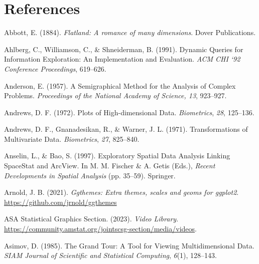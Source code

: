 \documentclass[
  letterpaper,
]{krantz}
\newlength{\cslhangindent}
\newlength{\cslentryspacingunit} %
\newenvironment{CSLReferences}[2] %
 {%
  \setlength{\parindent}{0pt}
  \ifodd #1
  \let\oldpar\par
  \def\par{\hangindent=\cslhangindent\oldpar}
  \fi
  \setlength{\parskip}{#2\cslentryspacingunit}
 }%
 {}
\begin{document}

\hypertarget{references}{%
\chapter*{References}\label{references}}


\hypertarget{refs}{}
\begin{CSLReferences}{1}{0}
\leavevmode{}%
Abbott, E. (1884). \emph{Flatland: A romance of many dimensions}. Dover
Publications.

\leavevmode{}%
Ahlberg, C., Williamson, C., \& Shneiderman, B. (1991). Dynamic
{Q}ueries for {I}nformation {E}xploration: {A}n {I}mplementation and
{E}valuation. \emph{ACM CHI `92 Conference Proceedings}, 619--626.

\leavevmode{}%
Anderson, E. (1957). A {S}emigraphical {M}ethod for the {A}nalysis of
{C}omplex {P}roblems. \emph{Proceedings of the National Academy of
Science, 13}, 923--927.

\leavevmode{}%
Andrews, D. F. (1972). {P}lots of {H}igh-dimensional {D}ata.
\emph{Biometrics}, \emph{28}, 125--136.

\leavevmode{}%
Andrews, D. F., Gnanadesikan, R., \& Warner, J. L. (1971).
{T}ransformations of {M}ultivariate {D}ata. \emph{Biometrics},
\emph{27}, 825--840.

\leavevmode{}%
Anselin, L., \& Bao, S. (1997). {E}xploratory {S}patial {D}ata
{A}nalysis {L}inking {S}pace{S}tat and {A}rc{V}iew. In M. M. Fischer \&
A. Getis (Eds.), \emph{{R}ecent {D}evelopments in {S}patial {A}nalysis}
(pp. 35--59). Springer.

\leavevmode{}%
Arnold, J. B. (2021). \emph{Ggthemes: Extra themes, scales and geoms for
ggplot2}. \url{https://github.com/jrnold/ggthemes}

\leavevmode{}%
ASA Statistical Graphics Section. (2023). \emph{Video {L}ibrary}.
\url{https://community.amstat.org/jointscsg-section/media/videos}.

\leavevmode{}%
Asimov, D. (1985). {T}he {G}rand {T}our: {A} {T}ool for {V}iewing
{M}ultidimensional {D}ata. \emph{SIAM Journal of Scientific and
Statistical Computing}, \emph{6}(1), 128--143.


\end{CSLReferences}
\end{document}
